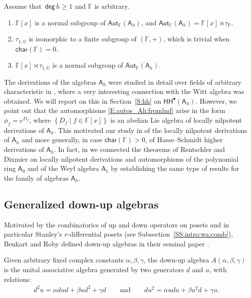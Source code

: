 \documentclass{commat}
\newcommand\q{\quad}
\newcommand{\FF}{\mathbb{F}}
\newcommand{\A}{\mathsf{A}}
\newcommand\chara{\mathsf {char}}
\newcommand\aut[1][\FF]{ \mathsf{Aut}_{#1}}
\newcommand\hoch{\mathsf{HH}}
\newcommand\degg{\, \mathsf{deg} \,}
\newcommand{\pb}[1]{\left\{ #1\right\}}
\begin{document}
\begin{theorem}
	Assume that $\degg h\geq 1$ and $\FF$ is arbitrary.
	\begin{enumerate}[label=(\alph*)]
		\item $\FF[x]$ is a normal subgroup of $\aut (\A_h)$, and
		$\displaystyle \aut(\A_h) = \FF[x] \rtimes \tau_{\mathbb P}$.
		\item $\tau_{1,\mathbb{G}}$ is isomorphic to a finite subgroup of $(\FF,+)$, which  is trivial when $\chara(\FF) = 0$.
		\item $\FF[x] \rtimes \tau_{1,\mathbb G}$ is a normal subgroup of $\mathsf{Aut}_\FF(\A_h)$.
	\end{enumerate} 
\end{theorem}

The derivations of the algebras $\A_h$ were studied in detail over fields of arbitrary characteristic in \cite{BLO15ja}, where a very interesting connection with the Witt algebra was obtained. We will report on this in Section~\ref{S:hh} on $\hoch^\bullet(\A_h)$. However, we point out that the automorphisms \eqref{E:autos_Ah:fromlnd} arise in the form $\phi_f=e^{D_f}$, where $\pb{D_f\mid f\in\FF[x]}$ is an abelian Lie algebra of locally nilpotent derivations of $\A_h$. This motivated our study in \cite{KLM21} of the locally nilpotent derivations of $\A_h$ and more generally, in case $\chara(\FF)>0$, of Hasse--Schmidt higher derivations of $\A_h$. In fact, in \cite{KLM21} we connected the theorems of Rentschler \cite{rR68} and Dixmier \cite{jD68} on locally nilpotent derivations and automorphisms of the polynomial ring $\A_0$ and of the Weyl algebra $\A_1$ by establishing the same type of results for the family of algebras $\A_h$.

\subsection{Generalized down-up algebras}\label{SS:isoautder:gdua}

Motivated by the combinatorics of up and down operators on posets and in particular Stanley's $r$-differential posets (see Subsection~\ref{SS:intro:wa:comb}), Benkart and Roby defined down-up algebras in their seminal paper \cite{BR98}. 

\begin{definition}\label{D:def:dua}
	Given arbitrary fixed complex constants $\alpha, \beta, \gamma$, the down-up algebra $A(\alpha, \beta, \gamma)$ is the unital associative algebra generated by two generators $d$ and $u$, with relations:
	\begin{align*}
		d^2 u=\alpha dud+\beta ud^2+\gamma d \q\q \text{and}\q\q du^2=\alpha udu+\beta u^2d+ \gamma u. 
	\end{align*}
\end{definition}
\end{document}
